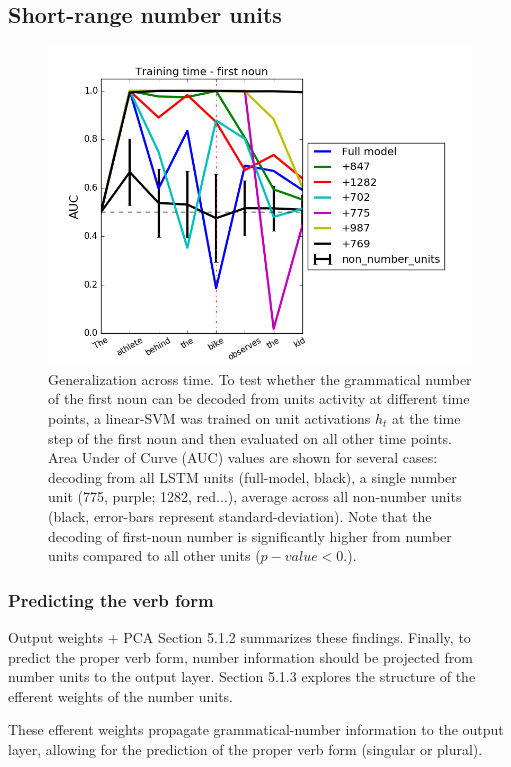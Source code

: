 \subsection{Short-range number units}
\lipsum[1]

\begin{figure}
\centering
\includegraphics[width=\linewidth]{Figures/Figure3_number_units_GAT.png}
\caption{Generalization across time. To test whether the grammatical number of the first noun can be decoded from units activity at different time points, a linear-SVM was trained on unit activations $h_t$ at the time step of the first noun and then evaluated on all other time points. Area Under of Curve (AUC) values are shown for several cases: decoding from all LSTM units (full-model, black), a single number unit (775, purple; 1282, red...), average across all non-number units (black, error-bars represent standard-deviation). Note that the decoding of first-noun number is significantly higher from number units compared to all other units ($p-value<0.$).}
\end{figure}


\subsubsection{Predicting the verb form}
Output weights + PCA
Section 5.1.2 summarizes these findings. Finally, to predict the proper verb form, number information should be projected from number units to the output layer. Section 5.1.3 explores the structure of the efferent weights of the number units. 

These efferent weights propagate grammatical-number information to the output layer, allowing for the prediction of the proper verb form (singular or plural). 

